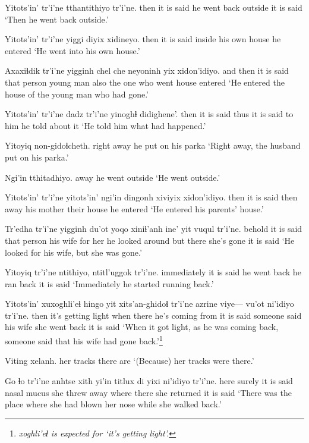 \documentclass[12pt]{article}
\begin{document}
\gll Yitots'in' tr'i'ne tthantithiyo tr'i'ne.
then  {it is said} {he went back outside} {it is said}
\glt `Then he went back outside.'
\glend

\gll Yitots'in' tr'i'ne yiggi diyix   xidineyo.
then  {it is said} inside  {his own house}  {he entered}
\glt `He went into his own house.'
\glend

\gll Axaxiɬdik tr'i'ne yigginh chel che neyoninh yix  xidon'idiyo.
{and then} {it is said} {that person} {young man} also {the one who went} house  entered
\glt `He entered the house of the young man who had gone.'
\glend

\gll Yitots'in' tr'i'ne dadz tr'i'ne yinoghɬ didighene'.
then  {it is said} thus {it is said} {to him} {he told about it}
\glt `He told him what had happened.'
\glend

\gll Yitoyiq non-gidoɬcheth.
{right away} {he put on his parka}
\glt `Right away, the husband put on his parka.'
\glend

\gll Ngi'in tthitadhiyo.
away  {he went outside}
\glt `He went outside.'
\glend

\gll Yitots'in' tr'i'ne yitots'in' ngi'in dingonh xiviyix xidon'idiyo.
then  {it is said} then  away {his mother} {their house} {he entered}
\glt `He entered his parents' house.'
\glend

\gll Tr'edha tr'i'ne yigginh du'ot  yoqo xiniɬ'anh ine' yit vuqul  tr'i'ne.
behold  {it is said} {that person} {his wife} {for her} {he looked around} but there {she's gone} {it is said}
\glt `He looked for his wife, but she was gone.'
\glend

\gll Yitoyiq tr'i'ne ntithiyo, ntitl'uggok tr'i'ne.
immediately {it is said} {he went back} {he ran back} {it is said}
\glt `Immediately he started running back.'
\glend

\gll Yitots'in' xuxoghli'eɬ hingo yit xits'an-ghidoɬ tr'i'ne azrine {viye---}  vu'ot  ni'idiyo tr'i'ne.
then {it's getting light} when there {he's coming from} {it is said} {someone said} {} {his wife} {she went back} {it is said}
\glt `When it got light, as he was coming back, someone said that his wife had gone back.'\footnote{\em xoghli'eɬ \em is expected for `it's getting light'.}
\glend

\gll Viting xelanh.
{her tracks} {there are}
\glt `(Because) her tracks were there.'
\glend

\gll Go ɬo tr'i'ne anhtse xith {yi'in titlux} di yixi ni'idiyo tr'i'ne.
here surely {it is said} nasal mucus {she threw away} where there {she returned} {it is said}
\glt `There was the place where she had blown her nose while she walked back.'
\glend
\end{document}
